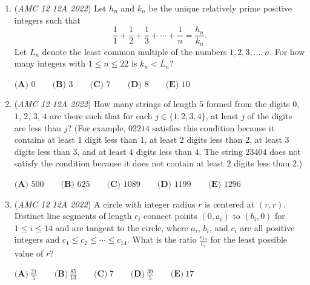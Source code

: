 \begin{enumerate}
 $\textbf{(A) }4.5 \qquad\textbf{(B) }5 \qquad\textbf{(C) }5.5 \qquad\textbf{(D) }6\qquad\textbf{(E) }6.5$


	\item (\textit{AMC 12 12A 2022}) Let $h_n$ and $k_n$ be the unique relatively prime positive integers such that 
 \[\frac{1}{1}+\frac{1}{2}+\frac{1}{3}+\cdots+\frac{1}{n}=\frac{h_n}{k_n}.\] Let $L_n$ denote the least common multiple of the numbers $1, 2, 3, \ldots, n$. For how many integers with $1\le{n}\le{22}$ is $k_n<L_n$?


 $\textbf{(A) }0 \qquad\textbf{(B) }3 \qquad\textbf{(C) }7 \qquad\textbf{(D) }8\qquad\textbf{(E) }10$


	\item (\textit{AMC 12 12A 2022}) How many strings of length $5$ formed from the digits $0$, $1$, $2$, $3$, $4$ are there such that for each $j \in \{1,2,3,4\}$, at least $j$ of the digits are less than $j$? (For example, $02214$ satisfies this condition
because it contains at least $1$ digit less than $1$, at least $2$ digits less than $2$, at least $3$ digits less
than $3$, and at least $4$ digits less than $4$. The string $23404$ does not satisfy the condition because it
does not contain at least $2$ digits less than $2$.)


 $\textbf{(A) }500\qquad\textbf{(B) }625\qquad\textbf{(C) }1089\qquad\textbf{(D) }1199\qquad\textbf{(E) }1296$


	\item (\textit{AMC 12 12A 2022}) A circle with integer radius $r$ is centered at $(r, r)$. Distinct line segments of length $c_i$ connect points $(0, a_i)$ to $(b_i, 0)$ for $1 \le i \le 14$ and are tangent to the circle, where $a_i$, $b_i$, and $c_i$ are all positive integers and $c_1 \le c_2 \le \cdots \le c_{14}$. What is the ratio $\frac{c_{14}}{c_1}$ for the least possible value of $r$?


 $\textbf{(A)} ~\frac{21}{5} \qquad\textbf{(B)} ~\frac{85}{13} \qquad\textbf{(C)} ~7 \qquad\textbf{(D)} ~\frac{39}{5} \qquad\textbf{(E)} ~17$


\end{enumerate}